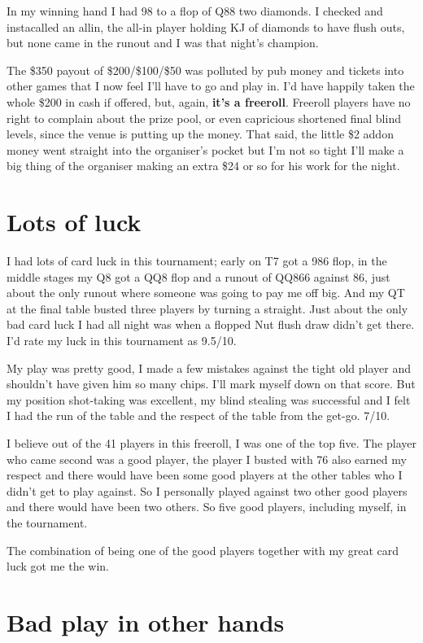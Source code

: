 In my winning hand I had 98 to a flop of Q88 two diamonds.
I checked and instacalled an allin, the all-in player holding
KJ of diamonds to have flush outs, but none came in the runout
and I was that night's champion.

The \$350 payout of \$200/\$100/\$50 was polluted by
pub money and tickets into other games that I now feel
I'll have to go and play in. I'd have happily taken the whole
\$200 in cash if offered, but, again, \textbf{it's a freeroll}.
Freeroll players have no right to complain about the prize pool,
or even capricious shortened final blind levels, since the
venue is putting up the money. That said, the little \$2 addon
money went straight into the organiser's pocket but I'm not
so tight I'll make a big thing of the organiser making an extra \$24
or so for his work for the night.

\section{Lots of luck}

I had lots of card luck in this tournament; early on T7 got a 986 flop,
in the middle stages my Q8 got a QQ8 flop and a runout of QQ866 against
86, just about the only runout where someone was going to pay me off big.
And my QT at the final table busted three players by turning a straight.
Just about the only bad card luck I had all night was when a flopped
Nut flush draw didn't get there. I'd rate my luck in this tournament
as 9.5/10.

My play was pretty good, I made a few mistakes against the tight old
player and shouldn't have given him so many chips. I'll mark myself
down on that score. But my position shot-taking was excellent, my blind
stealing was successful and I felt I had the run of the table and
the respect of the table from the get-go. 7/10.

I believe out of the 41 players in this freeroll, I was one of
the top five. The player who came second was a good player, the player
I busted with 76 also earned my respect and there would have been
some good players at the other tables who I didn't get to play
against. So I personally played against two other good players
and there would have been two others. So five good players,
including myself, in the tournament.

The combination of being one of the good players together
with my great card luck got me the win.

\section{Bad play in other hands}

